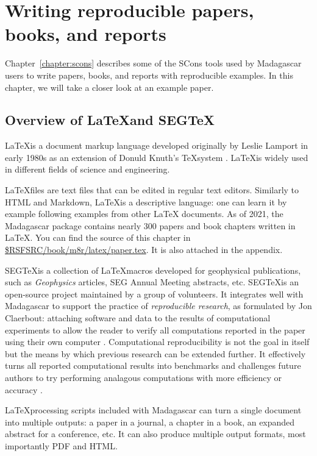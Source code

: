 \chapter{Writing reproducible papers, books, and reports}

Chapter~\ref{chapter:scons} describes some of the SCons tools used by
Madagascar users to write papers, books, and reports with reproducible
examples. In this chapter, we will take a closer look at an example paper.

\section{Overview of \LaTeX and SEG\TeX}

\LaTeX is a document markup language developed originally by Leslie
Lamport in early 1980s \cite[]{latex} as an extension of Donuld
Knuth's \TeX system \cite[]{tex}. \LaTeX is widely used in different
fields of science and engineering.

\LaTeX files are text files that can be edited in regular text
editors. Similarly to HTML and Markdown, \LaTeX is a descriptive
language: one can learn it by example following examples from other \LaTeX
documents. As of 2021, the Madagascar package contains nearly 300
papers and book chapters written in \LaTeX. You can find the source of
this chapter in
\href{https://github.com/ahay/src/blob/master/book/m8r/latex/paper.tex}
     {\$RSFSRC/book/m8r/latex/paper.tex}. It is also attached in the appendix.

     SEG\TeX is a collection of \LaTeX macros developed for
     geophysical publications, such as \emph{Geophysics} articles, SEG
     Annual Meeting abstracts, etc. SEG\TeX is an open-source project
     maintained by a group of volunteers. It integrates well with
     Madagascar to support the practice of \emph{reproducible
       research}, as formulated by Jon Claerbout: attaching software
     and data to the results of computational experiments to allow the
     reader to verify all computations reported in the paper using
     their own computer \cite[]{fomel2008guest}. Computational
     reproducibility is not the goal in itself but the means by which
     previous research can be extended further. It effectively turns
     all reported computational results into benchmarks and challenges
     future authors to try performing analagous computations with more
     efficiency or accuracy \cite[]{fomel2014reproducible}.

\LaTeX processing scripts included with Madagascar can turn a single
document into multiple outputs: a paper in a journal, a chapter in a
book, an expanded abstract for a conference, etc. It can also produce
multiple output formats, most importantly PDF and HTML.

